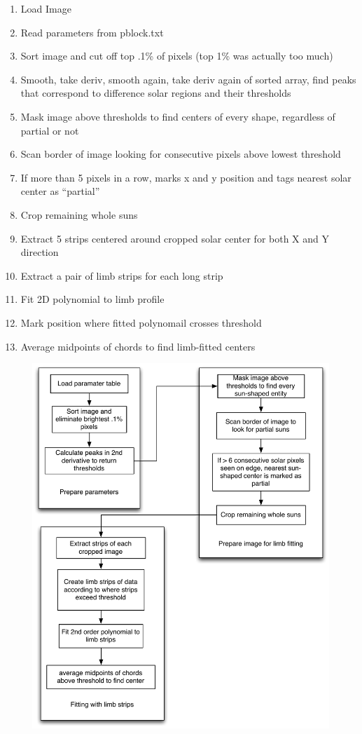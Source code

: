 \documentclass[10pt]{scrartcl}
\begin{document}
\begin{enumerate}
    \item Load Image
    \item Read parameters from pblock.txt
    \item Sort image and cut off top .1\% of pixels (top 1\% was actually too much)
    \item Smooth, take deriv, smooth again, take deriv again of sorted array, find peaks that correspond to difference solar regions and their thresholds
    \item Mask image above thresholds to find centers of every shape, regardless of partial or not
    \item Scan border of image looking for consecutive pixels above lowest threshold
    \item If more than 5 pixels in a row, marks x and y position and tags nearest solar center as ``partial''
    \item Crop remaining whole suns
    \item Extract 5 strips centered around cropped solar center for both X and Y direction
    \item Extract a pair of limb strips for each long strip
    \item Fit 2D polynomial to limb profile
    \item Mark position where fitted polynomail crosses threshold 
    \item Average midpoints of chords to find limb-fitted centers
\end{enumerate}

\begin{figure}[!ht]
    \centering
    \includegraphics[width=.9\textwidth]{../plots_tables_images/beta_flowchart.pdf}    
\end{figure}


\end{document}

